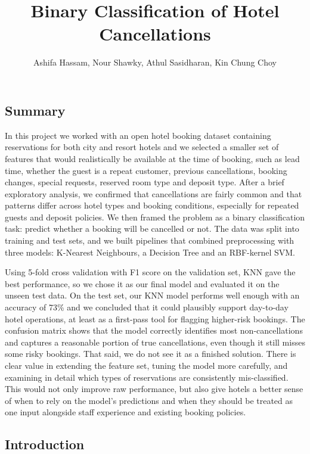 \documentclass[
  letterpaper,
  DIV=11,
  numbers=noendperiod]{scrartcl}
\title{Binary Classification of Hotel Cancellations}
\author{Ashifa Hassam, Nour Shawky, Athul Sasidharan, Kin Chung Choy}
\date{}
\renewcommand*\contentsname{Table of contents}
\newcommand\contentsname{Table of contents}
\begin{document}
\maketitle

\renewcommand*\contentsname{Table of contents}
{
\hypersetup{linkcolor=}
\setcounter{tocdepth}{3}
\tableofcontents
}

\subsection{Summary}\label{summary}

In this project we worked with an open hotel booking dataset containing
reservations for both city and resort hotels and we selected a smaller
set of features that would realistically be available at the time of
booking, such as lead time, whether the guest is a repeat customer,
previous cancellations, booking changes, special requests, reserved room
type and deposit type. After a brief exploratory analysis, we confirmed
that cancellations are fairly common and that patterns differ across
hotel types and booking conditions, especially for repeated guests and
deposit policies. We then framed the problem as a binary classification
task: predict whether a booking will be cancelled or not. The data was
split into training and test sets, and we built pipelines that combined
preprocessing with three models: K-Nearest Neighbours, a Decision Tree
and an RBF-kernel SVM.

Using 5-fold cross validation with F1 score on the validation set, KNN
gave the best performance, so we chose it as our final model and
evaluated it on the unseen test data. On the test set, our KNN model
performs well enough with an accuracy of 73\% and we concluded that it
could plausibly support day-to-day hotel operations, at least as a
first-pass tool for flagging higher-risk bookings. The confusion matrix
shows that the model correctly identifies most non-cancellations and
captures a reasonable portion of true cancellations, even though it
still misses some risky bookings. That said, we do not see it as a
finished solution. There is clear value in extending the feature set,
tuning the model more carefully, and examining in detail which types of
reservations are consistently mis-classified. This would not only
improve raw performance, but also give hotels a better sense of when to
rely on the model's predictions and when they should be treated as one
input alongside staff experience and existing booking policies.

\subsection{Introduction}\label{introduction}
\end{document}
